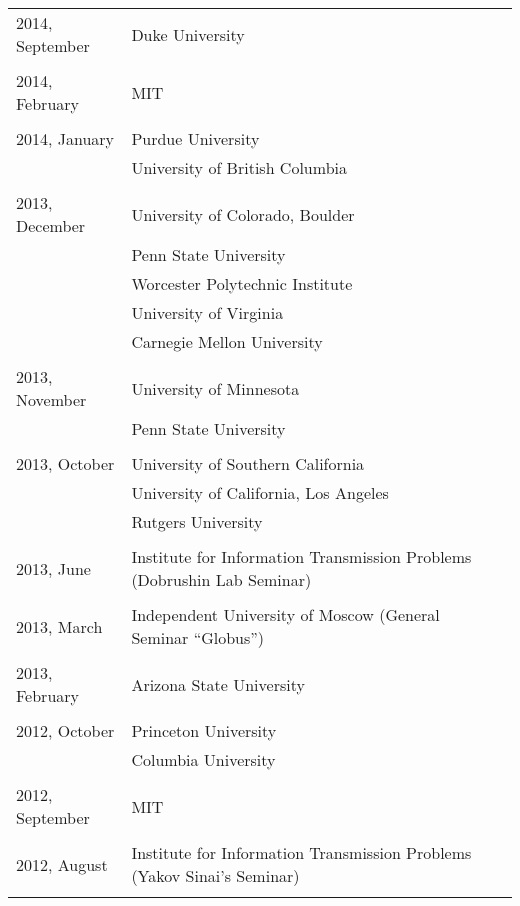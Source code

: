 \documentclass[letterpaper,11pt]{article}
\begin{document}
\begin{longtable}{llc}
	2014, September
	& Duke University\\\\

	2014, February
	& MIT\\\\

	2014, January
	  & Purdue University & \hspace{110pt}
	\\& University of British Columbia \\\\

	2013, December
	& University of Colorado, Boulder
	\\&Penn State University\\&Worcester Polytechnic Institute
	\\&University of Virginia\\&
	Carnegie Mellon University \\\\

	2013, November&
	University of Minnesota \\&
	Penn State University \\\\

	2013, October&
	University of Southern California
	\\&
	University of California, Los Angeles
	\\&Rutgers University\\\\

	2013, June& Institute for Information Transmission Problems
	(Dobrushin Lab Seminar)\\\\

	2013, March& Independent University of Moscow (General Seminar
	``Globus'')\\\\

	2013, February & Arizona State University\\\\

	2012, October & Princeton University \\
	& Columbia University\\\\

	2012, September & MIT \\\\

	2012, August
	& Institute for Information Transmission Problems
	(Yakov Sinai's Seminar)
	\\\\


\end{longtable}
\end{document}
